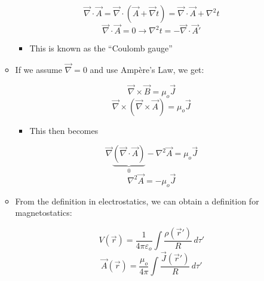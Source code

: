 \begin{itemize}
\begin{itemize}
\begin{itemize}
        \end{itemize}

        $$\vec{\nabla}\cdot\vec{A}=\vec{\nabla}\cdot(\vec{A}+\vec{\nabla}t)=\vec{\nabla}\cdot\vec{A}+\nabla^2t$$
        $$\vec{\nabla}\cdot\vec{A}=0\to \nabla^2t=-\vec{\nabla}\cdot\vec{A}\prime$$

        \begin{itemize}

          \item This is known as the ``Coulomb gauge''

        \end{itemize}

      \item If we assume $\vec{\nabla}=0$ and use Amp\`ere's Law, we get:

        $$\vec{\nabla}\times\vec{B}=\mu_o\vec{J}$$
        $$\vec{\nabla}\times(\vec{\nabla}\times\vec{A})=\mu_o\vec{J}$$

        \begin{itemize}

          \item This then becomes

        \end{itemize}

        $$\vec{\nabla}\underbrace{(\vec{\nabla}\cdot\vec{A})}_{0}-\nabla^2\vec{A}=\mu_o\vec{J}$$
        $$\nabla^2\vec{A}=-\mu_o\vec{J}$$

      \item From the definition in electrostatics, we can obtain a definition for magnetostatics:

        $$V(\vec{r})=\frac{1}{4\pi\varepsilon_o}\int\frac{\rho(\vec{r}\prime)}{R}\,d\tau'$$
        $$\vec{A}(\vec{r})=\frac{\mu_o}{4\pi}\int\frac{\vec{J}(\vec{r}\prime)}{R}\,d\tau'$$

    \end{itemize}

\end{itemize}



